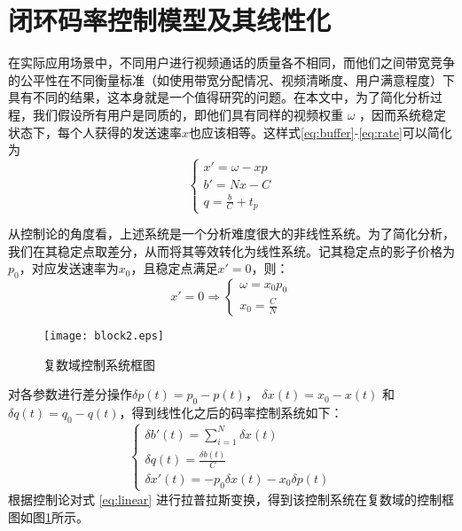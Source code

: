 \section{闭环码率控制模型及其线性化}
在实际应用场景中，不同用户进行视频通话的质量各不相同，而他们之间带宽竞争的公平性在不同衡量标准（如使用带宽分配情况、视频清晰度、用户满意程度）下具有不同的结果，这本身就是一个值得研究的问题。在本文中，为了简化分析过程，我们假设所有用户是同质的，即他们具有同样的视频权重 $\omega$ ，因而系统稳定状态下，每个人获得的发送速率$x$也应该相等。这样式\ref{eq:buffer}-\ref{eq:rate}可以简化为
\begin{equation}
\label{eq:rate_model}
\left\{\begin{array}{l}
    x' = \omega - xp \\
    b' = Nx - C\\
    q = \frac{b}{C} + t_p
\end{array} \right.
\end{equation}

从控制论的角度看，上述系统是一个分析难度很大的非线性系统。为了简化分析，我们在其稳定点取差分，从而将其等效转化为线性系统。记其稳定点的影子价格为$p_0$，对应发送速率为$x_0$，且稳定点满足$x'=0$，则：
\begin{equation}
x'=0 \Longrightarrow \left\{\begin{array}{l}
    \omega = x_0 p_0\\
    x_0 = \frac{C}{N}
\end{array} \right.
\end{equation}

\begin{figure}[htbp]
  \centering
  \texttt{[image: block2.eps]}
  \caption{复数域控制系统框图}
  \label{fig:block2}
\end{figure}

对各参数进行差分操作$\delta p(t)=p_0 - p(t)$， $\delta x(t) = x_0 - x(t)$ 和 $\delta q(t) =q_0 - q(t)$，得到线性化之后的码率控制系统如下：
\begin{equation}
\label{eq:linear}
\left\{\begin{array}{l}
    \delta b'(t) = \sum_{i=1}^{N}{\delta x(t)}  \\
    \delta q(t)  = \frac{\delta b(t)}{C} \\
    \delta x'(t) = -p_0\delta x(t) - x_0 \delta p(t)
\end{array} \right.
\end{equation}
根据控制论对式 \ref{eq:linear} 进行拉普拉斯变换，得到该控制系统在复数域的控制框图如图\ref{fig:block2}所示。

